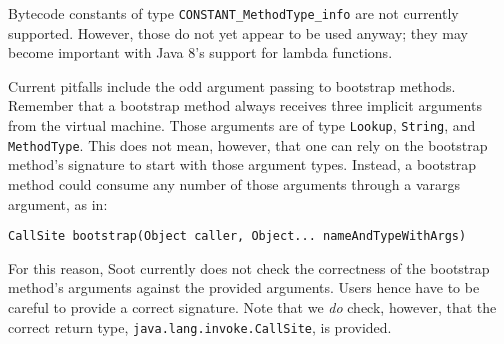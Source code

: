 \documentclass{article}
\begin{document}
Bytecode constants of type \texttt{CONSTANT\_MethodType\_info} are not
currently supported. However, those do not yet appear to be used anyway; they
may become important with Java 8's support for lambda functions.

Current pitfalls include the odd argument passing to bootstrap methods. Remember
that a bootstrap method always receives three implicit arguments from the
virtual machine. Those arguments are of type \texttt{Lookup}, \texttt{String},
and \texttt{MethodType}. This does not mean, however, that one can rely on the
bootstrap method's signature to start with those argument types. Instead, a
bootstrap method could consume any number of those arguments through a varargs
argument, as in:
\begin{verbatim}
CallSite bootstrap(Object caller, Object... nameAndTypeWithArgs)
\end{verbatim}
For this reason, Soot currently does not check the correctness of the bootstrap
method's arguments against the provided arguments. Users hence have to be
careful to provide a correct signature. Note that we \emph{do} check, however,
that the correct return type, \texttt{java.lang.invoke.CallSite}, is provided.
\end{document}
